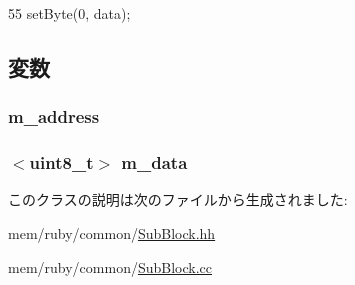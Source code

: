 \begin{DoxyCode}
55 { setByte(0, data); }
\end{DoxyCode}


\subsection{変数}
\hypertarget{classSubBlock_a9fc76d7db60d4f05200f8248a697ea28}{
\subsubsection[{m\_\-address}]{ {\bf m\_\-address}}}
\label{classSubBlock_a9fc76d7db60d4f05200f8248a697ea28}
\hypertarget{classSubBlock_a84a8da60d3838968e643ef3e2f04ba7f}{
\subsubsection[{m\_\-data}]{$<$uint8\_\-t$>$ {\bf m\_\-data}}}
\label{classSubBlock_a84a8da60d3838968e643ef3e2f04ba7f}


このクラスの説明は次のファイルから生成されました:\begin{DoxyCompactItemize}
\item 
mem/ruby/common/\hyperlink{SubBlock_8hh}{SubBlock.hh}\item 
mem/ruby/common/\hyperlink{SubBlock_8cc}{SubBlock.cc}\end{DoxyCompactItemize}

